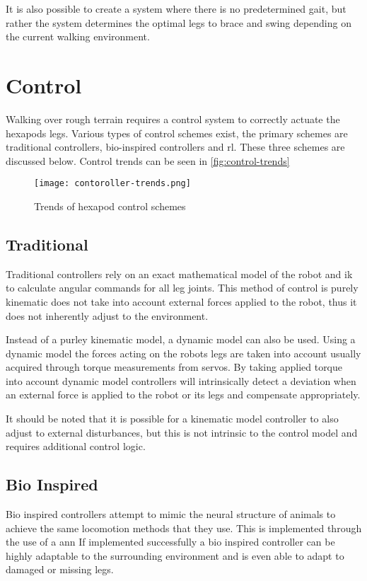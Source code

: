 It is also possible to create a system where there is no predetermined gait, but rather the system determines the optimal legs to brace and swing depending on the current walking environment.

\section{Control}
Walking over rough terrain requires a control system to correctly actuate the hexapods legs. Various types of control schemes exist, the primary schemes are traditional controllers, bio-inspired controllers and \ac{rl}. These three schemes are discussed below. Control trends can be seen in \autoref{fig:control-trends}
\begin{figure}[h]
    \centering
    \texttt{[image: contoroller-trends.png]}
    \caption{Trends of hexapod control schemes \citep{coelho2021trends}}
    \label{fig:control-trends}
\end{figure}

    \subsection{Traditional}
    Traditional controllers rely on an exact mathematical model of the robot and \ac{ik} to calculate angular commands for all leg joints. This method of control is purely kinematic does not take into account external forces applied to the robot, thus it does not inherently adjust to the environment.

    Instead of a purley kinematic model, a dynamic model can also be used. Using a dynamic model the forces acting on the robots legs are taken into account usually acquired through torque measurements from servos. By taking applied torque into account dynamic model controllers will intrinsically detect a deviation when an external force is applied to the robot or its legs and compensate appropriately.

    It should be noted that it is possible for a kinematic model controller to also adjust to external disturbances, but this is not intrinsic to the control model and requires additional control logic.
    
    \subsection{Bio Inspired}
    Bio inspired controllers attempt to mimic the neural structure of animals to achieve the same locomotion methods that they use. This is implemented through the use of a \ac{ann} If implemented successfully a bio inspired controller can be highly adaptable to the surrounding environment and is even able to adapt to damaged or missing legs.

